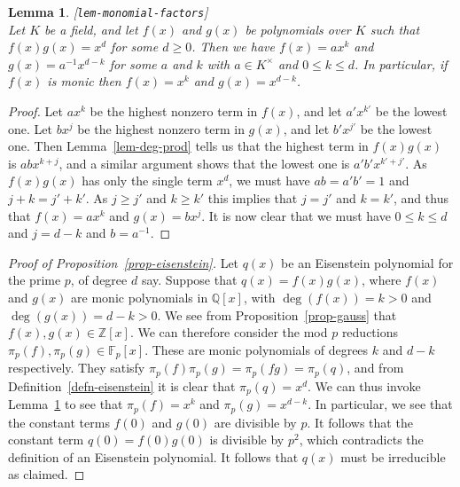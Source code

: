 \documentclass{amsart}
\newcommand{\lbl}[1]{\label{#1}\textup{[\texttt{#1}]}\ \\}
\newcommand{\lbl}{\label}
\newcommand{\Z}         {{\mathbb{Z}}}
\newcommand{\Q}         {{\mathbb{Q}}}
\newcommand{\F}         {{\mathbb{F}}}
\newcommand{\tm}        {\times}
\renewcommand{\:}{\colon}
\newtheorem{lemma}[theorem]{Lemma}
\theoremstyle{definition}
\begin{document}
\begin{lemma}\lbl{lem-monomial-factors}
 Let $K$ be a field, and let $f(x)$ and $g(x)$ be polynomials over $K$
 such that $f(x)g(x)=x^d$ for some $d\geq 0$.  Then we have
 $f(x)=ax^k$ and $g(x)=a^{-1}x^{d-k}$ for some $a$ and $k$ with
 $a\in K^\tm$ and $0\leq k\leq d$.  In particular, if $f(x)$ is monic
 then $f(x)=x^k$ and $g(x)=x^{d-k}$.
\end{lemma}
\begin{proof}
 Let $ax^k$ be the highest nonzero term in $f(x)$, and let $a'x^{k'}$
 be the lowest one.  Let $bx^j$ be the highest nonzero term in $g(x)$,
 and let $b'x^{j'}$ be the lowest one.  Then Lemma~\ref{lem-deg-prod}
 tells us that the highest term in $f(x)g(x)$ is $abx^{k+j}$, and
 a similar argument shows that the lowest one is $a'b'x^{k'+j'}$.  As
 $f(x)g(x)$ has only the single term $x^d$, we must have $ab=a'b'=1$
 and $j+k=j'+k'$.  As $j\geq j'$ and $k\geq k'$ this implies that
 $j=j'$ and $k=k'$, and thus that $f(x)=ax^k$ and $g(x)=bx^j$.  It is
 now clear that we must have $0\leq k\leq d$ and $j=d-k$ and
 $b=a^{-1}$.   
\end{proof}

\begin{proof}[Proof of Proposition~\ref{prop-eisenstein}]
 Let $q(x)$ be an Eisenstein polynomial for the prime $p$, of degree
 $d$ say.  Suppose that $q(x)=f(x)g(x)$, where $f(x)$ and $g(x)$ are
 monic polynomials in $\Q[x]$, with $\deg(f(x))=k>0$ and
 $\deg(g(x))=d-k>0$.  We see from Proposition~\ref{prop-gauss} that
 $f(x),g(x)\in\Z[x]$.  We can therefore consider the mod $p$
 reductions $\pi_p(f),\pi_p(g)\in\F_p[x]$.  These are monic
 polynomials of degrees $k$ and $d-k$ respectively.  They satisfy
 $\pi_p(f)\pi_p(g)=\pi_p(fg)=\pi_p(q)$, and from
 Definition~\ref{defn-eisenstein} it is clear that $\pi_p(q)=x^d$.  We
 can thus invoke Lemma~\ref{lem-monomial-factors} to see that
 $\pi_p(f)=x^k$ and $\pi_p(g)=x^{d-k}$.  In particular, we see that
 the constant terms $f(0)$ and $g(0)$ are divisible by $p$.  It
 follows that the constant term $q(0)=f(0)g(0)$ is divisible by $p^2$,
 which contradicts the definition of an Eisenstein polynomial.  It
 follows that $q(x)$ must be irreducible as claimed.
\end{proof}
\end{document}

